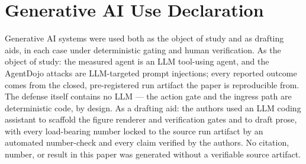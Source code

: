 \documentclass[sigconf,anonymous,review]{acmart}
\begin{document}
\label{end-of-body}
\nocite{*}



\label{end-of-bib}
\appendix

\section{Generative AI Use Declaration}
Generative AI systems were used both as the object of study and as drafting aids, in each case under deterministic gating and human verification. As the object of study: the measured agent is an LLM tool-using agent, and the AgentDojo attacks are LLM-targeted prompt injections; every reported outcome comes from the closed, pre-registered run artifact the paper is reproducible from. The defense itself contains no LLM --- the action gate and the ingress path are deterministic code, by design. As a drafting aid: the authors used an LLM coding assistant to scaffold the figure renderer and verification gates and to draft prose, with every load-bearing number locked to the source run artifact by an automated number-check and every claim verified by the authors. No citation, number, or result in this paper was generated without a verifiable source artifact.


\label{end-of-appendix}
\end{document}
